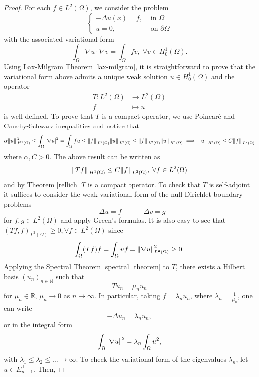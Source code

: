 \begin{proof}
    For each \(f \in L^2(\Omega)\), we consider the problem
    \[
        \begin{cases}
            -\Delta u(x) = f, & \text{ in } \Omega\\
            u = 0, & \text{ on } \partial \Omega
        \end{cases} 
    \]
    with the associated variational form
    \[
        \int_\Omega \nabla u \cdot \nabla v = \int_\Omega f v, \; \forall v \in H^1_0(\Omega).
    \]
    Using Lax-Milgram Theorem \ref{lax-milgram}, it is straightforward to prove that the variational form above admits a unique weak solution \(u \in H^1_0(\Omega)\) and the operator
    \begin{align*}
        T: L^2(\Omega) &\rightarrow L^2(\Omega)\\
        f &\mapsto u
    \end{align*}
    is well-defined. To prove that \(T\) is a compact operator, we use Poincaré and Cauchy-Schwarz inequalities and notice that
    \[
        \alpha\norm*{u}_{H^1(\Omega)}^2 \leq \int_\Omega \abs{\nabla u}^2 = \int_\Omega f u \leq \norm*{f}_{L^2(\Omega)}\norm*{u}_{L^2(\Omega)} \leq \norm*{f}_{L^2(\Omega)}\norm*{u}_{H^1(\Omega)} \implies \norm*{u}_{H^1(\Omega)} \leq C \norm*{f}_{L^2(\Omega)}
    \]
    where \(\alpha, C > 0\). The above result can be written as
    \[
        \norm*{Tf}_{H^1(\Omega)} \leq C \norm*{f}_{L^2(\Omega)}, \; \forall f \in L^2(\Omega)
    \]
    and by Theorem \ref{rellich} \(T\) is a compact operator. To check that \(T\) is self-adjoint it suffices to consider the weak variational form of the null Dirichlet boundary problems
    \[
        -\Delta u = f \qquad -\Delta v = g
    \]
    for \(f,g \in L^2(\Omega)\) and apply Green's formulas. It is also easy to see that \((Tf, f)_{L^2(\Omega)} \geq 0, \forall f \in L^2(\Omega)\) since 
    \[
        \int_\Omega (Tf) f = \int_\Omega u f = \norm{\nabla u}_{L^2(\Omega)}^2 \geq 0.
    \]
    Applying the Spectral Theorem \ref{spectral_theorem} to \(T\), there exists a Hilbert basis \((u_n)_{n \in \mathbb{N}}\) such that
    \[
        T u_n = \mu_n u_n
    \]
    for \(\mu_n \in \mathbb{R}\), \(\mu_n \rightarrow 0\) as \(n \rightarrow \infty\). In particular, taking \(f = \lambda_n u_n\), where \(\lambda_n = \frac{1}{\mu_n}\), one can write
    \[
        -\Delta u_n = \lambda_n u_n,
    \]
    or in the integral form
    \[
        \int_\Omega \abs*{\nabla u}^2 = \lambda_n \int_\Omega u^2,
    \]
    with \(\lambda_1 \leq \lambda_2 \leq \dots \rightarrow \infty\). To check the variational form of the eigenvalues \(\lambda_n\), let \(u \in E_{n-1}^\perp\). Then,

\end{proof}
